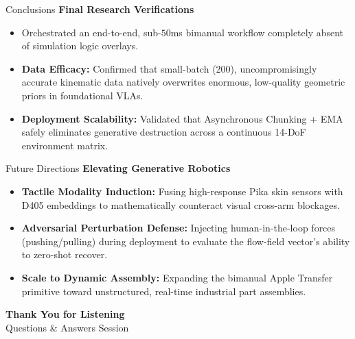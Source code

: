 \documentclass[aspectratio=169, t]{beamer}
\begin{document}
\begin{frame}{Conclusions}
    {\Large \textbf{Final Research Verifications}}
    \vspace{0.5cm}
    \begin{itemize}
        \item Orchestrated an end-to-end, sub-$50$ms bimanual workflow completely absent of simulation logic overlays.
        \item \textbf{Data Efficacy:} Confirmed that small-batch (200), uncompromisingly accurate kinematic data natively overwrites enormous, low-quality geometric priors in foundational VLAs.
        \item \textbf{Deployment Scalability:} Validated that Asynchronous Chunking + EMA safely eliminates generative destruction across a continuous 14-DoF environment matrix.
    \end{itemize}
\end{frame}

\begin{frame}{Future Directions}
    {\Large \textbf{Elevating Generative Robotics}}
    \vspace{0.5cm}
    \begin{itemize}
        \item \textbf{Tactile Modality Induction:} Fusing high-response Pika skin sensors with D405 embeddings to mathematically counteract visual cross-arm blockages.
        \item \textbf{Adversarial Perturbation Defense:} Injecting human-in-the-loop forces (pushing/pulling) during deployment to evaluate the flow-field vector's ability to zero-shot recover.
        \item \textbf{Scale to Dynamic Assembly:} Expanding the bimanual Apple Transfer primitive toward unstructured, real-time industrial part assemblies.
    \end{itemize}
\end{frame}

\begin{frame}[plain]
    \vspace*{2.5cm}
    \begin{center}
        \Huge \textbf{Thank You for Listening} \\[1cm]
        \Large Questions \& Answers Session
    \end{center}
\end{frame}
\end{document}
